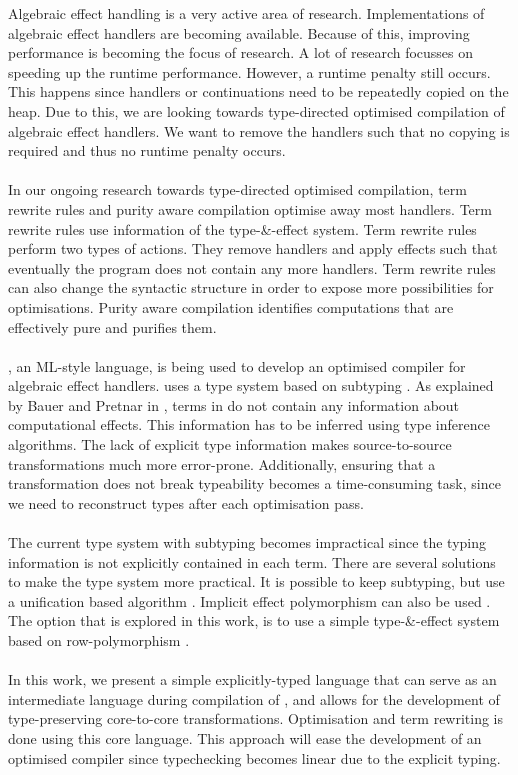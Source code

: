 
\label{intro}
Algebraic effect handling is a very active area of research. Implementations of algebraic effect handlers are becoming available. Because of this, improving performance is becoming the focus of research. A lot of research focusses on speeding up the runtime performance. However, a runtime penalty still occurs. This happens since handlers or continuations need to be repeatedly copied on the heap. Due to this, we are looking towards type-directed optimised compilation of algebraic effect handlers. We want to remove the handlers such that no copying is required and thus no runtime penalty occurs. \\
\\
In our ongoing research towards type-directed optimised compilation, term rewrite rules and purity aware compilation optimise away most handlers. Term rewrite rules use information of the type-\&-effect system. Term rewrite rules perform two types of actions. They remove handlers and apply effects such that eventually the program does not contain any more handlers. Term rewrite rules can also change the syntactic structure in order to expose more possibilities for optimisations. Purity aware compilation identifies computations that are effectively pure and purifies them.  \\
\\
\eff, an ML-style language, is being used to develop an optimised compiler for algebraic effect handlers. \eff uses a type system based on subtyping \cite{effectsystem}. As explained by Bauer and Pretnar in \cite{programming}, terms in \eff do not contain any information about computational effects. This information has to be inferred using type inference algorithms. The lack of explicit type information makes source-to-source transformations much more error-prone. Additionally, ensuring that a transformation does not break typeability becomes a time-consuming task, since we need to reconstruct types after each optimisation pass. \\
\\
The current type system with subtyping becomes impractical since the typing information is not explicitly contained in each term. There are several solutions to make the type system more practical. It is possible to keep subtyping, but use a unification based algorithm \cite{mlsub}. Implicit effect polymorphism can also be used \cite{impliciteff}. The option that is explored in this work, is to use a simple type-\&-effect system based on row-polymorphism \cite{type-directed, leijen2014koka, row}. \\
\\
In this work, we present a simple explicitly-typed language that can serve as an intermediate language during compilation of \eff, and allows for the development of type-preserving core-to-core transformations. Optimisation and term rewriting is done using this core language. This approach will ease the development of an optimised compiler since typechecking becomes linear due to the explicit typing.
